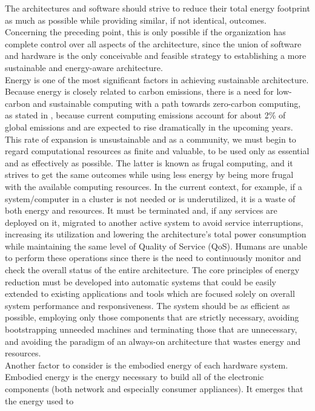 The architectures and software should strive to reduce their total energy footprint
as much as possible while providing similar, if not identical, outcomes.
Concerning the preceding point, this is only possible if the organization has complete
control over all aspects of the architecture, since the union of software and
hardware is the only conceivable and feasible strategy to establishing a more
sustainable and energy-aware architecture. \\ %
Energy is one of the most significant factors in achieving sustainable
architecture. Because energy is closely related to carbon emissions, there is a
need for low-carbon and sustainable computing with a path towards zero-carbon
computing, as stated in \cite{frugal_computing}, because current computing
emissions account for about 2\% of global emissions and are expected to rise dramatically
in the upcoming years. This rate of expansion is unsustainable and as a
community, we must begin to regard computational resources as finite and valuable,
to be used only as essential and as effectively as possible. The latter is known
as frugal computing, and it strives to get the same outcomes while using less
energy by being more frugal with the available computing resources. In the current
context, for example, if a system/computer in a cluster is not needed or is underutilized,
it is a waste of both energy and resources. It must be terminated and, if any
services are deployed on it, migrated to another active system to avoid service interruptions,
increasing its utilization and lowering the architecture's total power
consumption while maintaining the same level of Quality of Service (QoS). Humans
are unable to perform these operations since there is the need to continuously monitor
and check the overall status of the entire architecture. The core principles of
energy reduction must be developed into automatic systems that could be easily
extended to existing applications and tools which are focused solely on overall
system performance and responsiveness. The system should be as efficient as possible,
employing only those components that are strictly necessary, avoiding bootstrapping
unneeded machines and terminating those that are unnecessary, and avoiding the
paradigm of an always-on architecture that wastes energy and resources. \\ %
Another factor to consider is the embodied energy of each hardware system. Embodied
energy is the energy necessary to build all of the electronic components (both
network and especially consumer appliances). It emerges that the energy used to

